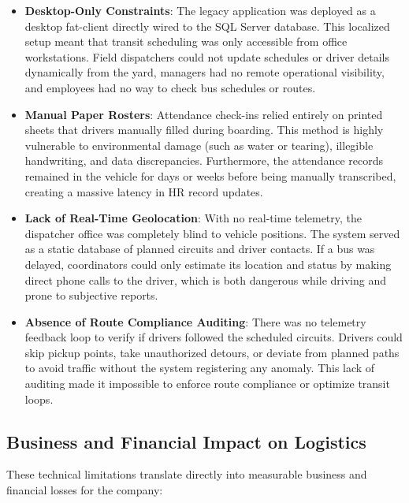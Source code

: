 \begin{itemize}
  \item \textbf{Desktop-Only Constraints}: The legacy application was deployed as a desktop fat-client directly wired to the SQL Server database. This localized setup meant that transit scheduling was only accessible from office workstations. Field dispatchers could not update schedules or driver details dynamically from the yard, managers had no remote operational visibility, and employees had no way to check bus schedules or routes.
  \item \textbf{Manual Paper Rosters}: Attendance check-ins relied entirely on printed sheets that drivers manually filled during boarding. This method is highly vulnerable to environmental damage (such as water or tearing), illegible handwriting, and data discrepancies. Furthermore, the attendance records remained in the vehicle for days or weeks before being manually transcribed, creating a massive latency in HR record updates.
  \item \textbf{Lack of Real-Time Geolocation}: With no real-time telemetry, the dispatcher office was completely blind to vehicle positions. The system served as a static database of planned circuits and driver contacts. If a bus was delayed, coordinators could only estimate its location and status by making direct phone calls to the driver, which is both dangerous while driving and prone to subjective reports.
  \item \textbf{Absence of Route Compliance Auditing}: There was no telemetry feedback loop to verify if drivers followed the scheduled circuits. Drivers could skip pickup points, take unauthorized detours, or deviate from planned paths to avoid traffic without the system registering any anomaly. This lack of auditing made it impossible to enforce route compliance or optimize transit loops.
\end{itemize}

\subsection{Business and Financial Impact on Logistics}

These technical limitations translate directly into measurable business and financial losses for the company:

